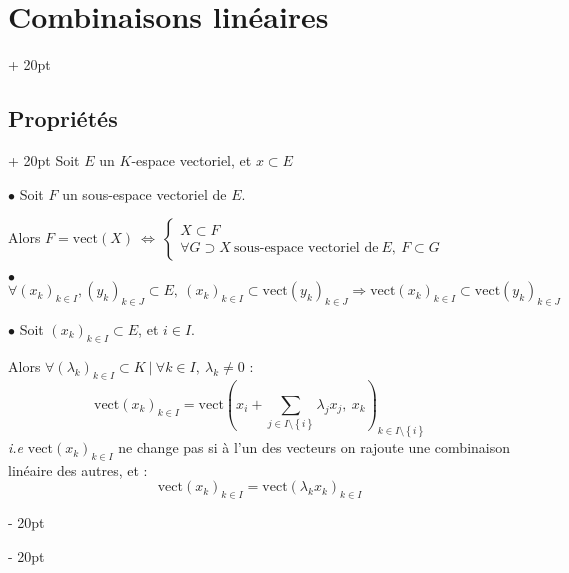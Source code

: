 \documentclass[a4paper, 12pt, twoside]{article}
\newcommand{\lr}[1]{\left( #1 \right)}
\newcommand{\set}[1]{\left\{ #1 \right\}}
\newcommand{\ssi}{\ \Leftrightarrow \ }
\newcommand{\eqsys}[2]{\begin{cases} #1 \\ #2 \end{cases}}
\newcommand{\ind}[1][20pt]{\advance\leftskip + #1}
\newcommand{\deind}[1][20pt]{\advance\leftskip - #1}
\newenvironment{indt}[2][20pt]{#2 \par \ind[#1]}{\par \deind} %
\begin{document}
\begin{indt}{\section{Combinaisons linéaires}}
\begin{indt}{\subsection{Propriétés}}
            Soit $E$ un $K$-espace vectoriel, et $x \subset E$
            
            $\bullet$ Soit $F$ un sous-espace vectoriel de $E$.
            
            Alors $F = \mathrm{vect}(X) \ssi \eqsys{X \subset F}{\forall G \supset X\ \text{sous-espace vectoriel de}\ E,\ F \subset G}$
            
            \vspace{12pt}
            
            $\bullet$ $\forall (x_k)_{k \in I}, (y_k)_{k \in J} \subset E,\ (x_k)_{k \in I} \subset \mathrm{vect}(y_k)_{k \in J} \Rightarrow \mathrm{vect}(x_k)_{k \in I} \subset \mathrm{vect}(y_k)_{k \in J}$
            
            \vspace{12pt}
            
            $\bullet$ Soit $(x_k)_{k \in I} \subset E$, et $i \in I$.
            
            Alors $\forall (\lambda_k)_{k \in I} \subset K\ |\ \forall k \in I,\ \lambda_k \neq 0$ :
                \[ \mathrm{vect}(x_k)_{k \in I} = \mathrm{vect}\lr{x_i + \sum_{j \in I \setminus \set i} \lambda_j x_j,\ x_k}_{k \in I \setminus \set i} \]
            \textit{i.e} $\mathrm{vect}(x_k)_{k \in I}$ ne change pas si à l’un des vecteurs on rajoute une combinaison linéaire des autres, et :
                \[ \mathrm{vect}(x_k)_{k \in I} = \mathrm{vect}(\lambda_k x_k)_{k \in I} \]
        \end{indt}
        
    \end{indt}
    
    \vspace{12pt}
    
\end{document}
